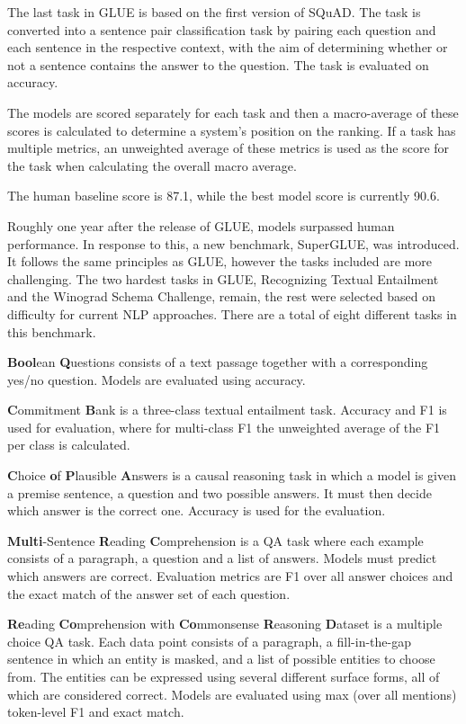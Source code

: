 \documentclass[]{krantz}
\begin{document}
The last task in GLUE is based on the first version of SQuAD. The task is converted into a sentence pair classification task by pairing each question and each sentence in the respective context, with the aim of determining whether or not a sentence contains the answer to the question. The task is evaluated on accuracy.

The models are scored separately for each task and then a macro-average of these scores is calculated to determine a system's position on the ranking. If a task has multiple metrics, an unweighted average of these metrics is used as the score for the task when calculating the overall macro average. \citep{wang2018glue}

The human baseline score is 87.1, while the best model score is currently 90.6.

Roughly one year after the release of GLUE, models surpassed human performance. In response to this, a new benchmark, SuperGLUE, was introduced. It follows the same principles as GLUE, however the tasks included are more challenging. The two hardest tasks in GLUE, Recognizing Textual Entailment and the Winograd Schema Challenge, remain, the rest were selected based on difficulty for current NLP approaches. There are a total of eight different tasks in this benchmark.

\textbf{Bool}ean \textbf{Q}uestions consists of a text passage together with a corresponding yes/no question. Models are evaluated using accuracy.

\textbf{C}ommitment \textbf{B}ank is a three-class textual entailment task. Accuracy and F1 is used for evaluation, where for multi-class F1 the unweighted average of the F1 per class is calculated.

\textbf{C}hoice \textbf{o}f \textbf{P}lausible \textbf{A}nswers is a causal reasoning task in which a model is given a premise sentence, a question and two possible answers. It must then decide which answer is the correct one. Accuracy is used for the evaluation.

\textbf{Multi}-Sentence \textbf{R}eading \textbf{C}omprehension is a QA task where each example consists of a paragraph, a question and a list of answers. Models must predict which answers are correct. Evaluation metrics are F1 over all answer choices and the exact match of the answer set of each question.

\textbf{Re}ading \textbf{Co}mprehension with \textbf{Co}mmonsense \textbf{R}easoning \textbf{D}ataset is a multiple choice QA task. Each data point consists of a paragraph, a fill-in-the-gap sentence in which an entity is masked, and a list of possible entities to choose from. The entities can be expressed using several different surface forms, all of which are considered correct. Models are evaluated using max (over all mentions) token-level F1 and exact match.
\end{document}
